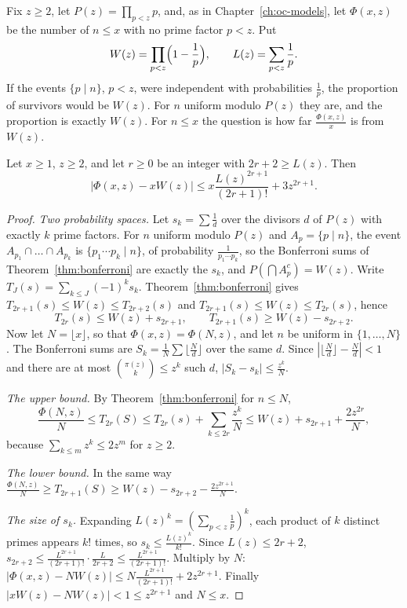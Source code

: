 Fix $z\ge2$, let $P(z)=\prod_{p<z}p$, and, as in Chapter~\ref{ch:oc-models}, let $\Phi(x,z)$ be the number of $n\le x$ with no prime factor $p<z$. Put
\[
W(z)=\prod_{p<z}\Bigl(1-\frac1p\Bigr),\qquad L(z)=\sum_{p<z}\frac1p.
\]
If the events $\{p\mid n\}$, $p<z$, were independent with probabilities $\frac1p$, the proportion of survivors would be $W(z)$. For $n$ uniform modulo $P(z)$ they are, and the proportion is exactly $W(z)$. For $n\le x$ the question is how far $\frac{\Phi(x,z)}x$ is from $W(z)$.

\begin{theorem}\label{thm:brunpure}
Let $x\ge1$, $z\ge2$, and let $r\ge0$ be an integer with $2r+2\ge L(z)$. Then
\[
\bigl|\Phi(x,z)-xW(z)\bigr|\le x\frac{L(z)^{2r+1}}{(2r+1)!}+3z^{2r+1}.
\]
\end{theorem}
\begin{proof}
\emph{Two probability spaces.} Let $s_k=\sum\frac1d$ over the divisors $d$ of $P(z)$ with exactly $k$ prime factors. For $n$ uniform modulo $P(z)$ and $A_p=\{p\mid n\}$, the event $A_{p_1}\cap\dots\cap A_{p_k}$ is $\{p_1\cdots p_k\mid n\}$, of probability $\frac1{p_1\cdots p_k}$, so the Bonferroni sums of Theorem~\ref{thm:bonferroni} are exactly the $s_k$, and $P(\bigcap A_p^c)=W(z)$. Write $T_J(s)=\sum_{k\le J}(-1)^ks_k$. Theorem~\ref{thm:bonferroni} gives $T_{2r+1}(s)\le W(z)\le T_{2r+2}(s)$ and $T_{2r+1}(s)\le W(z)\le T_{2r}(s)$, hence
\[
T_{2r}(s)\le W(z)+s_{2r+1},\qquad T_{2r+1}(s)\ge W(z)-s_{2r+2}.
\]
Now let $N=\lfloor x\rfloor$, so that $\Phi(x,z)=\Phi(N,z)$, and let $n$ be uniform in $\{1,\dots,N\}$. The Bonferroni sums are $S_k=\frac1N\sum\lfloor\frac Nd\rfloor$ over the same $d$. Since $|\lfloor\frac Nd\rfloor-\frac Nd|<1$ and there are at most $\binom{\pi(z)}k\le z^k$ such $d$, $|S_k-s_k|\le\frac{z^k}N$.

\emph{The upper bound.} By Theorem~\ref{thm:bonferroni} for $n\le N$,
\[
\frac{\Phi(N,z)}N\le T_{2r}(S)\le T_{2r}(s)+\sum_{k\le2r}\frac{z^k}N\le W(z)+s_{2r+1}+\frac{2z^{2r}}N,
\]
because $\sum_{k\le m}z^k\le2z^m$ for $z\ge2$.

\emph{The lower bound.} In the same way $\frac{\Phi(N,z)}N\ge T_{2r+1}(S)\ge W(z)-s_{2r+2}-\frac{2z^{2r+1}}N$.

\emph{The size of $s_k$.} Expanding $L(z)^k=(\sum_{p<z}\frac1p)^k$, each product of $k$ distinct primes appears $k!$ times, so $s_k\le\frac{L(z)^k}{k!}$. Since $L(z)\le2r+2$, $s_{2r+2}\le\frac{L^{2r+1}}{(2r+1)!}\cdot\frac L{2r+2}\le\frac{L^{2r+1}}{(2r+1)!}$. Multiply by $N$: $|\Phi(x,z)-NW(z)|\le N\frac{L^{2r+1}}{(2r+1)!}+2z^{2r+1}$. Finally $|xW(z)-NW(z)|<1\le z^{2r+1}$ and $N\le x$.
\end{proof}

